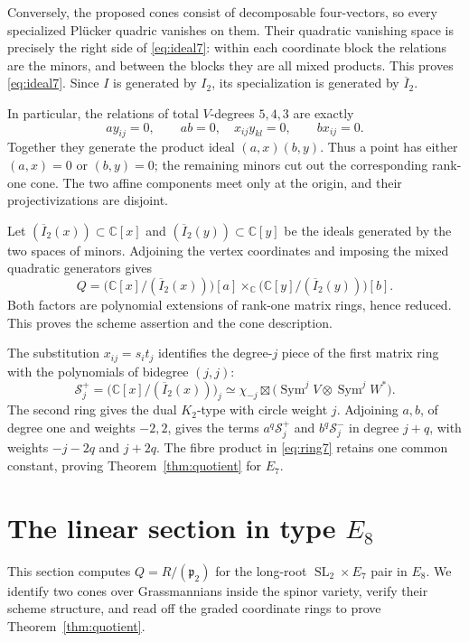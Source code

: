 \documentclass[11pt]{article}
\newcommand{\C}{\mathbb C}
\newcommand{\Sym}{\operatorname{Sym}}
\newcommand{\SL}{\operatorname{SL}}
\newcommand{\fp}{\mathfrak p}
\theoremstyle{definition}
\numberwithin{equation}{section}
\begin{document}
Conversely, the proposed cones consist of decomposable four-vectors,
so every specialized Pl\"ucker quadric vanishes on them.
Their quadratic vanishing space is precisely the right side of
\eqref{eq:ideal7}: within each coordinate block the relations are the
minors, and between the blocks they are all mixed products.
This proves \eqref{eq:ideal7}. Since $I$ is generated by $I_2$,
its specialization is generated by $\overline I_2$.

In particular, the relations of total $V$-degrees $5,4,3$ are exactly
\[
 ay_{ij}=0,\qquad ab=0,\quad x_{ij}y_{kl}=0,\qquad bx_{ij}=0.
\]
Together they generate the product ideal $(a,x)(b,y)$.
Thus a point has either $(a,x)=0$ or $(b,y)=0$; the remaining minors
cut out the corresponding rank-one cone. The two affine components
meet only at the origin, and their projectivizations are disjoint.

Let $(\overline I_2(x))\subset\C[x]$ and
$(\overline I_2(y))\subset\C[y]$ be the ideals generated by the two
spaces of minors. Adjoining the vertex coordinates and imposing the
mixed quadratic generators gives
\begin{equation}\label{eq:ring7}
 Q=\bigl(\C[x]/(\overline I_2(x))\bigr)[a]\times_\C
       \bigl(\C[y]/(\overline I_2(y))\bigr)[b].
\end{equation}
Both factors are polynomial extensions of rank-one matrix rings, hence
reduced. This proves the scheme assertion and the cone description.

The substitution $x_{ij}=s_it_j$ identifies the degree-$j$ piece
of the first matrix ring with the polynomials of bidegree $(j,j)$:
\[
 \mathcal S_j^+=\bigl(\C[x]/(\overline I_2(x))\bigr)_j
 \simeq\chi_{-j}\boxtimes
       \bigl(\Sym^jV\otimes\Sym^jW^*\bigr).
\]
The second ring gives the dual $K_2$-type with circle weight $j$.
Adjoining $a,b$, of degree one and weights $-2,2$, gives the terms
$a^q\mathcal S_j^+$ and $b^q\mathcal S_j^-$ in degree $j+q$,
with weights $-j-2q$ and $j+2q$. The fibre product in
\eqref{eq:ring7} retains one common constant, proving
Theorem~\ref{thm:quotient} for $E_7$.

\section{The linear section in type \texorpdfstring{$E_8$}{E8}}\label{sec:e8}
This section computes $Q=R/(\fp_2)$ for the long-root
$\SL_2\times E_7$ pair in $E_8$. We identify two cones over
Grassmannians inside the spinor variety, verify their scheme structure,
and read off the graded coordinate rings to prove
Theorem~\ref{thm:quotient}.
\end{document}
